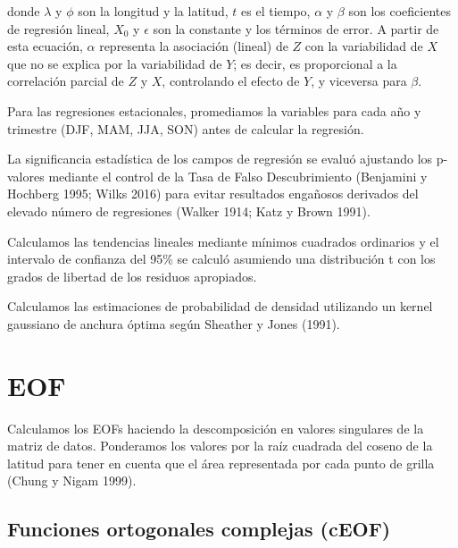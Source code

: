 \documentclass[12pt,oneside,a4paper]{reedthesis}
\begin{document}
donde \(\lambda\) y \(\phi\) son la longitud y la latitud, \(t\) es el tiempo, \(\alpha\) y \(\beta\) son los coeficientes de regresión lineal, \(X_0\) y \(\epsilon\) son la constante y los términos de error.
A partir de esta ecuación, \(\alpha\) representa la asociación (lineal) de \(Z\) con la variabilidad de \(X\) que no se explica por la variabilidad de \(Y\); es decir, es proporcional a la correlación parcial de \(Z\) y \(X\), controlando el efecto de \(Y\), y viceversa para \(\beta\).

Para las regresiones estacionales, promediamos la variables para cada año y trimestre (DJF, MAM, JJA, SON) antes de calcular la regresión.

La significancia estadística de los campos de regresión se evaluó ajustando los p-valores mediante el control de la Tasa de Falso Descubrimiento (Benjamini y Hochberg 1995; Wilks 2016) para evitar resultados engañosos derivados del elevado número de regresiones (Walker 1914; Katz y Brown 1991).

Calculamos las tendencias lineales mediante mínimos cuadrados ordinarios y el intervalo de confianza del 95\% se calculó asumiendo una distribución t con los grados de libertad de los residuos apropiados.

Calculamos las estimaciones de probabilidad de densidad utilizando un kernel gaussiano de anchura óptima según Sheather y Jones (1991).

\hypertarget{eof}{%
\section{EOF}\label{eof}}

Calculamos los EOFs haciendo la descomposición en valores singulares de la matriz de datos.
Ponderamos los valores por la raíz cuadrada del coseno de la latitud para tener en cuenta que el área representada por cada punto de grilla (Chung y Nigam 1999).

\hypertarget{ceof-metodo}{%
\subsection{Funciones ortogonales complejas (cEOF)}\label{ceof-metodo}}
\end{document}
